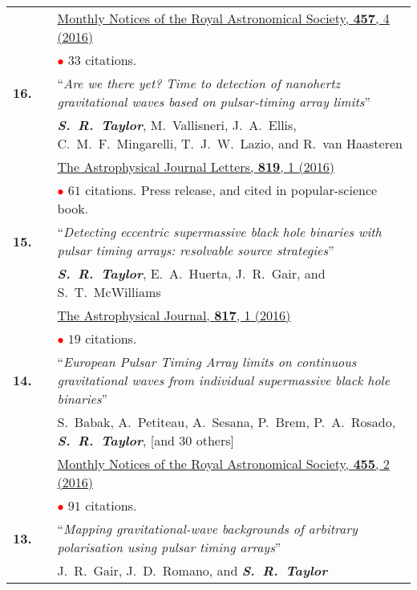 \documentclass[11pt,letterpaper,sans]{moderncv}
\begin{document}
{\begin{longtable}{rp{0.3cm}p{15.8cm}}
&&  \href{http://mnras.oxfordjournals.org/content/457/4/4421}{{\color{color1} Monthly Notices of the Royal Astronomical Society, \textbf{457}, 4 (2016)}} \\
&& \textcolor{red}{$\bullet$} $33$ citations. \vspace{0.09cm}\\
\textbf{16.} & & ``\textit{Are we there yet? Time to detection of nanohertz gravitational waves based on pulsar-timing array limits}'' \\ 
&& \textit{\textbf{S.~R.~Taylor}}, M.~Vallisneri, J.~A.~Ellis, C.~M.~F.~Mingarelli, T.~J.~W.~Lazio, and R.~van Haasteren \\ 
&&  \href{http://iopscience.iop.org/article/10.3847/2041-8205/819/1/L6/meta}{{\color{color1} The Astrophysical Journal Letters, \textbf{819}, 1 (2016)}} \\
&& \textcolor{red}{$\bullet$} $61$ citations. Press release, and cited in popular-science book. \vspace{0.09cm}\\
\textbf{15.} & & ``\textit{Detecting eccentric supermassive black hole binaries with pulsar timing arrays: resolvable source strategies}'' \\ 
&& \textit{\textbf{S.~R.~Taylor}}, E.~A.~Huerta, J.~R.~Gair, and S.~T.~McWilliams \\ 
&& \href{http://iopscience.iop.org/article/10.3847/0004-637X/817/1/70/meta}{{\color{color1} The Astrophysical Journal, \textbf{817}, 1 (2016)}} \\
&& \textcolor{red}{$\bullet$} $19$ citations. \vspace{0.09cm}\\
\textbf{14.} & & ``\textit{European Pulsar Timing Array limits on continuous gravitational waves from individual supermassive black hole binaries}'' \\ 
&& S.~Babak, A.~Petiteau, A.~Sesana, P.~Brem, P.~A.~Rosado, \textit{\textbf{S.~R.~Taylor}}, [and 30 others] \\ 
&& \href{http://mnras.oxfordjournals.org/content/455/2/1665}{{\color{color1} Monthly Notices of the Royal Astronomical Society, \textbf{455}, 2 (2016)}} \\
&& \textcolor{red}{$\bullet$} $91$ citations. \vspace{0.09cm}\\
\textbf{13.} & & ``\textit{Mapping gravitational-wave backgrounds of arbitrary polarisation using pulsar timing arrays}'' \\ 
&& J.~R.~Gair, J.~D.~Romano, and \textit{\textbf{S.~R.~Taylor}} \\ 

\end{longtable}}
\end{document}
